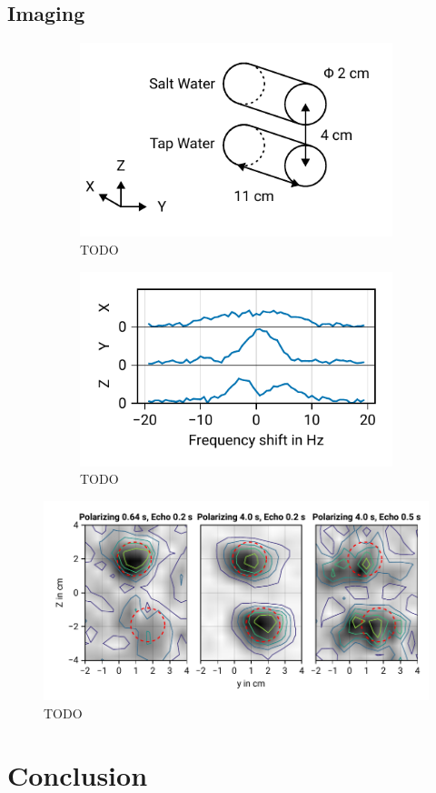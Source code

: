 \documentclass[
    parskip=half, 
    twoside=false,
    twocolumn=true,
    fontsize=11pt,
]{scrarticle}
\begin{document}
\subsection{Imaging}
\begin{figure}
    \centering
    \begin{subfigure}[c]{.45\textwidth}
        \includegraphics{figures/07 sample holder.pdf}
        \caption{TODO}
    \end{subfigure}
    \begin{subfigure}[c]{.45\textwidth}
        \includegraphics{figures/07 1d imaging.pdf}
        \caption{TODO}
    \end{subfigure}
    \caption{}
\end{figure}

\begin{figure}
    \centering
    \includegraphics{figures/08 2d imaging.pdf}
    \caption{TODO}
\end{figure}


\section{Conclusion}

\nocite{*}
\printbibliography
\end{document}
